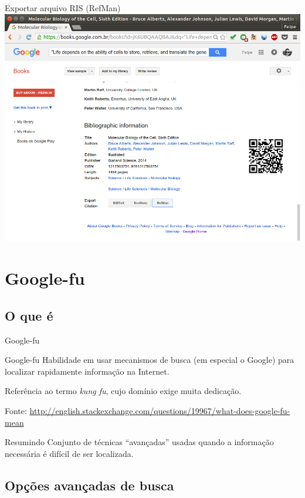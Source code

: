 \documentclass{beamer}
\begin{document}
\begin{frame}{Exportar arquivo RIS (RefMan)}
  \includegraphics[height=.85\textheight]{Busca/gbooks-about2}
\end{frame}

\section{Google-fu}

\subsection{O que é}

\begin{frame}{Google-fu}
  \begin{block}{Google-fu}
    Habilidade em usar mecanismos de busca (em especial o Google) para
    localizar rapidamente informação na Internet.

    \bigskip
    Referência ao termo {\em kung fu}, cujo domínio exige muita
    dedicação.
  \end{block}
  Fonte: \url{http://english.stackexchange.com/questions/19967/what-does-google-fu-mean}

  \begin{block}{Resumindo}
    Conjunto de técnicas ``avançadas'' usadas quando a informação
    necessária é difícil de ser localizada.
  \end{block}
\end{frame}

\subsection{Opções avançadas de busca}
\end{document}
